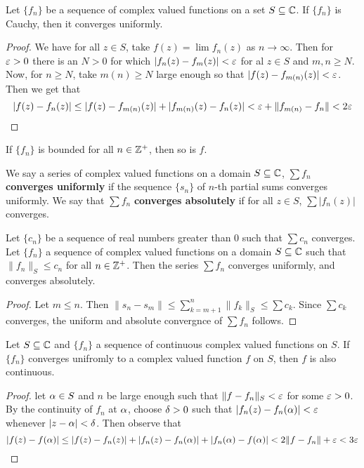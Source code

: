 \begin{theorem}\label{2.2.6}
    Let $\{f_n\}$ be a sequence of complex valued functions on a set $S
    \subseteq \mathbb{C}$. If  $\{f_n\}$ is Cauchy, then it converges uniformly.
\end{theorem}
\begin{proof}
    We have for all $z \in S$, take  $f(z)=\lim{f_n(z)}$ as $n \xrightarrow{}
    \infty$. Then for $\varepsilon>0$ there is an  $N>0$ for which  $|f_n(z)-f_m(z)|<\varepsilon$
    for al $z \in S$ and  $m,n \geq N$. Now, for  $n \geq N$, take $m(n) \geq N$
    large enough so that $|f(z)-f_{m(n)}(z)|<\varepsilon$. Then we get that
    \begin{equation*}
        |f(z)-f_n(z)| \leq
        |f(z)-f_{m(n)}(z)|+|f_{m(n)}(z)-f_n(z)|<\varepsilon+\|f_{m(n)}-f_n\|<2\varepsilon
    \end{equation*}
\end{proof}
\begin{corollary}
    If $\{f_n\}$ is bounded for all $n \in \mathbb{Z}^+$, then so is  $f$.
\end{corollary}

\begin{definition}
    We say a series of complex valued functions on a domain $S \subseteq \mathbb{C}$,
    $\sum{f_n}$ \textbf{converges uniformly} if the sequence $\{s_n\}$ of $n$-th
    partial sums converges uniformly. We say that  $\sum{f_n}$ \textbf{converges
    absolutely} if for all $z \in S$,  $\sum{|f_n(z)|}$ converges.
\end{definition}

\begin{theorem}\label{2.2.7}
    Let $\{c_n\}$ be a sequence of real numbers greater than $0$ such that
    $\sum{c_n}$ converges. Let $\{f_n\}$ a sequence of complex valued functions
    on a domain $S \subseteq \mathbb{C}$ such that  $\|f_n\|_S \leq c_n$ for all  $n \in
    \mathbb{Z}^+$. Then the series $\sum{f_n}$ converges uniformly, and converges
    absolutely.
\end{theorem}
\begin{proof}
    Let $m \leq n$. Then  $\|s_n-s_m\| \leq \sum_{k=m+1}^n{\|f_k\|_S} \leq
    \sum{c_k}$. Since $\sum{c_k}$ converges, the uniform and absolute convergnce
    of $\sum{f_n}$ follows.
\end{proof}

\begin{theorem}\label{2.2.8}
    Let $S \subseteq \mathbb{C}$ and  $\{f_n\}$ a sequence of continuous complex valued
    functions on $S$. If  $\{f_n\}$ converges unifromly to a complex valued
    function $f$ on  $S$, then  $f$ is also continuous.
\end{theorem}
\begin{proof}
    let $\alpha \in S$ and  $n$ be large enough such that  $\|f-f_n\|_S<\varepsilon$ for some
     $\varepsilon>0$. By the continuity of  $f_n$ at  $\alpha$, choose  $\delta>0$ such that
     $|f_n(z)-f_n(\alpha)|<\varepsilon$ whenever $|z-\alpha|<\delta$. Then observe that
     \begin{equation*}
         |f(z)-f(\alpha)| \leq
         |f(z)-f_n(z)|+|f_n(z)-f_n(\alpha)|+|f_n(\alpha)-f(\alpha)|<2\|f-f_n\|+\varepsilon<3\varepsilon
     \end{equation*}
\end{proof}

